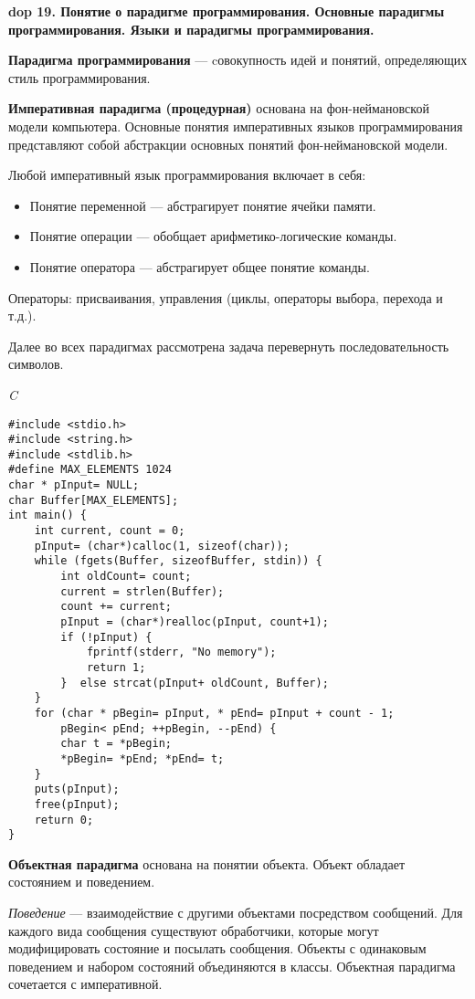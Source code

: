 \textbf{\LARGE dop 19. Понятие  о  парадигме  программирования.  Основные  парадигмы  программирования.  Языки  и  парадигмы программирования.}

\textbf{Парадигма программирования} --- cовокупность идей и понятий, определяющих стиль программирования.

\textbf{Императивная парадигма (процедурная)} основана на фон-неймановской модели компьютера. 
Основные понятия императивных языков программирования представляют собой абстракции основных понятий фон-неймановской модели. 

Любой императивный язык программирования включает в себя:
\begin{itemize}
    \item Понятие переменной --- абстрагирует понятие ячейки памяти.
    \item Понятие операции --- обобщает арифметико-логические команды.
    \item Понятие оператора --- абстрагирует общее понятие команды.
\end{itemize}

Операторы: присваивания, управления (циклы, операторы выбора, перехода и т.д.).

Далее во всех парадигмах рассмотрена задача перевернуть последовательность символов.

\textit{C}
\begin{lstlisting}[basicstyle=\ttfamily\small, frame=single] 
#include <stdio.h>
#include <string.h>
#include <stdlib.h>
#define MAX_ELEMENTS 1024
char * pInput= NULL;
char Buffer[MAX_ELEMENTS];
int main() {
    int current, count = 0;
    pInput= (char*)calloc(1, sizeof(char));
    while (fgets(Buffer, sizeofBuffer, stdin)) {
        int oldCount= count;
        current = strlen(Buffer);
        count += current;
        pInput = (char*)realloc(pInput, count+1);
        if (!pInput) {
            fprintf(stderr, "No memory");
            return 1;
        }  else strcat(pInput+ oldCount, Buffer);
    }
    for (char * pBegin= pInput, * pEnd= pInput + count - 1; 
        pBegin< pEnd; ++pBegin, --pEnd) {
        char t = *pBegin;
        *pBegin= *pEnd; *pEnd= t;
    }
    puts(pInput); 
    free(pInput);
    return 0;
}
    \end{lstlisting}
    
\bigbreak
\textbf{Объектная парадигма} основана на понятии объекта. 
Объект обладает состоянием и поведением.

\textit{Поведение} --- взаимодействие с другими объектами посредством сообщений.
Для каждого вида сообщения существуют обработчики, которые могут модифицировать состояние и посылать сообщения. 
Объекты с одинаковым поведением и набором состояний объединяются в классы.
Объектная парадигма сочетается с императивной.

